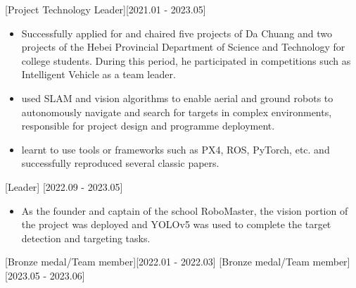 \documentclass{resume}
\begin{document}
[Project Technology Leader][2021.01 - 2023.05] 

\begin{itemize}
  \item Successfully applied for and chaired five projects of Da Chuang and two projects of the Hebei Provincial Department of Science and Technology for college students. During this period, he participated in competitions such as Intelligent Vehicle as a team leader.
  \item used SLAM and vision algorithms to enable aerial and ground robots to autonomously navigate and search for targets in complex environments, responsible for project design and programme deployment.
  \item learnt to use tools or frameworks such as PX4, ROS, PyTorch, etc. and successfully reproduced several classic papers.
\end{itemize}

[Leader]
[2022.09 - 2023.05] 

\begin{itemize}
  \item As the founder and captain of the school RoboMaster, the vision portion of the project was deployed and YOLOv5 was used to complete the target detection and targeting tasks.
\end{itemize}

[Bronze medal/Team member][2022.01 - 2022.03] 
[Bronze medal/Team member][2023.05 - 2023.06] 
\end{document}
